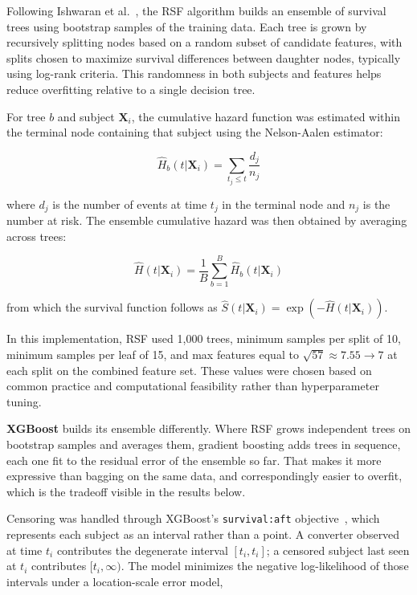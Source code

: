 \documentclass[blue]{ludusofficial}  %
\begin{document}
Following Ishwaran et al.~\cite{ishwaran2008rsf}, the RSF algorithm builds an ensemble of survival trees using bootstrap samples of the training data. Each tree is grown by recursively splitting nodes based on a random subset of candidate features, with splits chosen to maximize survival differences between daughter nodes, typically using log-rank criteria. This randomness in both subjects and features helps reduce overfitting relative to a single decision tree.

For tree $b$ and subject $\mathbf{X}_i$, the cumulative hazard function was estimated within the terminal node containing that subject using the Nelson-Aalen estimator:

\begin{equation}
    \hat{H}_b(t | \mathbf{X}_i) = \sum_{t_j \leq t} \frac{d_j}{n_j}
\end{equation}

where $d_j$ is the number of events at time $t_j$ in the terminal node and $n_j$ is the number at risk. The ensemble cumulative hazard was then obtained by averaging across trees:

\begin{equation}
    \hat{H}(t | \mathbf{X}_i) = \frac{1}{B} \sum_{b=1}^{B} \hat{H}_b(t | \mathbf{X}_i)
\end{equation}

from which the survival function follows as $\hat{S}(t | \mathbf{X}_i) = \exp(-\hat{H}(t | \mathbf{X}_i))$.


In this implementation, RSF used 1,000 trees, minimum samples per split of 10, minimum samples per leaf of 15, and max features equal to $\sqrt{57} \approx 7.55 \rightarrow 7$ at each split on the combined feature set. These values were chosen based on common practice and computational feasibility rather than hyperparameter tuning.

\textbf{XGBoost} builds its ensemble differently. Where RSF grows independent trees on bootstrap samples and averages them, gradient boosting adds trees in sequence, each one fit to the residual error of the ensemble so far. That makes it more expressive than bagging on the same data, and correspondingly easier to overfit, which is the tradeoff visible in the results below.

Censoring was handled through XGBoost's \texttt{survival:aft} objective~\cite{barnwal2022survivalxgb}, which represents each subject as an interval rather than a point. A converter observed at time $t_i$ contributes the degenerate interval $[t_i, t_i]$; a censored subject last seen at $t_i$ contributes $[t_i, \infty)$. The model minimizes the negative log-likelihood of those intervals under a location-scale error model,
\end{document}
